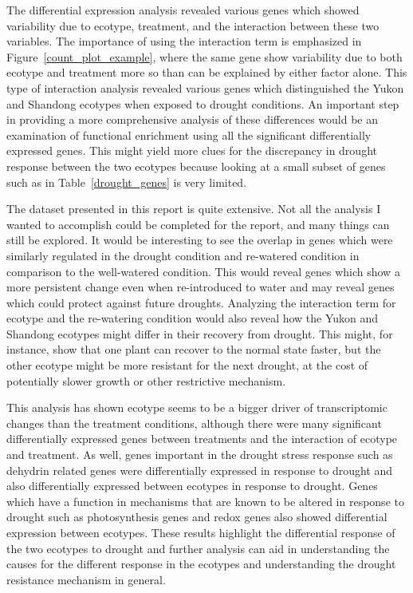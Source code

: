 \documentclass[12pt]{article}
\begin{document}
	The differential expression analysis revealed various genes which showed variability due to ecotype, treatment, and the interaction between these two variables. The importance of using the interaction term is emphasized in Figure~\ref{count_plot_example}, where the same gene show variability due to both ecotype and treatment more so than can be explained by either factor alone. This type of interaction analysis revealed various genes which distinguished the Yukon and Shandong ecotypes when exposed to drought conditions. An important step in providing a more comprehensive analysis of these differences would be an examination of functional enrichment using all the significant differentially expressed genes. This might yield more clues for the discrepancy in drought response between the two ecotypes because looking at a small subset of genes such as in Table~\ref{drought_genes} is very limited. 
	
	The dataset presented in this report is quite extensive. Not all the analysis I wanted to accomplish could be completed for the report, and many things can still be explored. It would be interesting to see the overlap in genes which were similarly regulated in the drought condition and re-watered condition in comparison to the well-watered condition. This would reveal genes which show a more persistent change even when re-introduced to water and may reveal genes which could protect against future droughts. Analyzing the interaction term for ecotype and the re-watering condition would also reveal how the Yukon and Shandong ecotypes might differ in their recovery from drought. This might, for instance, show that one plant can recover to the normal state faster, but the other ecotype might be more resistant for the next drought, at the cost of potentially slower growth or other restrictive mechanism.
	
	This analysis has shown ecotype seems to be a bigger driver of transcriptomic changes than the treatment conditions, although there were many significant differentially expressed genes between treatments and the interaction of ecotype and treatment. As well, genes important in the drought stress response such as dehydrin related genes were differentially expressed in response to drought and also differentially expressed between ecotypes in response to drought. Genes which have a function in mechanisms that are known to be altered in response to drought such as photosynthesis genes and redox genes also showed differential expression between ecotypes. These results highlight the differential response of the two ecotypes to drought and further analysis can aid in understanding the causes for the different response in the ecotypes and understanding the drought resistance mechanism in general.
	
\clearpage


\end{document}
